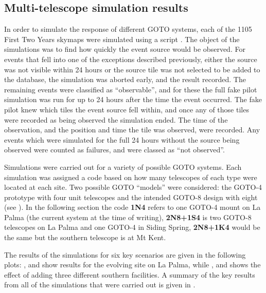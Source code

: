 \subsection{Multi-telescope simulation results}
\label{sec:gw_sim_results}
\begin{colsection}

In order to simulate the response of different GOTO systems, each of the 1105 First Two Years skymaps \citep{First2Years} were simulated using a script . The object of the simulations was to find how quickly the event source would be observed. For events that fell into one of the exceptions described previously, either the source was not visible within 24 hours or the source tile was not selected to be added to the database, the simulation was aborted early, and the result recorded. The remaining events were classified as ``observable'', and for these the full fake pilot simulation was run for up to 24 hours after the time the event occurred. The fake pilot knew which tiles the event source fell within, and once any of those tiles were recorded as being observed the simulation ended. The time of the observation, and the position and time the tile was observed, were recorded. Any events which were simulated for the full 24 hours without the source being observed were counted as failures, and were classed as ``not observed''.

Simulations were carried out for a variety of possible GOTO systems. Each simulation was assigned a code based on how many telescopes of each type were located at each site. Two possible GOTO ``models'' were considered: the GOTO-4 prototype with four unit telescopes and the intended GOTO-8 design with eight (see ). In the following section the code \textbf{1N4} refers to one GOTO-4 mount on La Palma (the current system at the time of writing), \textbf{2N8+1S4} is two GOTO-8 telescopes on La Palma and one GOTO-4 in Siding Spring, \textbf{2N8+1K4} would be the same but the southern telescope is at Mt Kent.

The results of the simulations for six key scenarios are given in the following plots: ,  and  show results for the evolving site on La Palma, while ,  and  shows the effect of adding three different southern facilities. A summary of the key results from all of the simulations that were carried out is given in .


\end{colsection}
